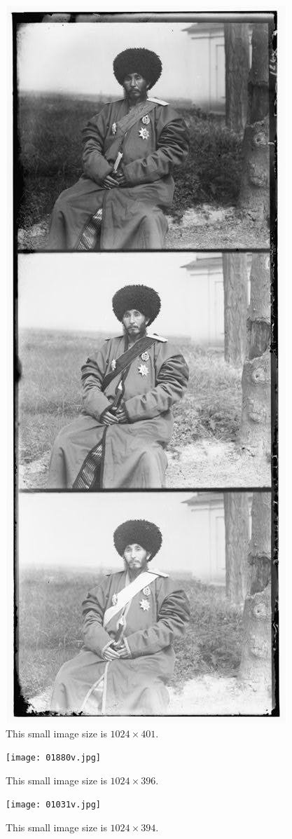 \documentclass{article}
\begin{document}
\begin{}
\begin{figure}[h!]
    \centering
    \includegraphics[scale=0.5]{00106v.jpg}
    \caption{This small image size is $1024 \times 401$.}
    \label{fig:hat_man}
\end{figure}
\begin{figure}[h!]
    \centering
    \texttt{[image: 01880v.jpg]}
    \caption{This small image size is $1024 \times 396$.}
    \label{fig:gate1}
\end{figure}
\begin{figure}[h!]
    \centering
    \texttt{[image: 01031v.jpg]}
    \caption{This small image size is $1024 \times 394$.}
    \label{fig:picture2}
\end{figure}


\end{}
\end{document}
